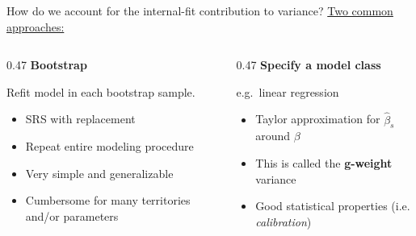 \documentclass[
  ignorenonframetext,
  aspectratio=169,
]{beamer}
\begin{document}
\begin{frame}{How do we account for the internal-fit contribution to
variance?}
\label{how-do-we-account-for-the-internal-fit-contribution-to-variance}
\underline{Two common approaches:} \vspace{0.7em}

\begin{columns}[T,onlytextwidth]

\begin{column}{0.47\textwidth}
\textbf{Bootstrap}

\vspace{0.4em}

Refit model in each bootstrap sample.

\vspace{0.8em}

\begin{itemize}
  \item SRS with replacement \vspace{0.5em}
  \item Repeat entire modeling procedure \vspace{0.5em}
  \item Very simple and generalizable \vspace{0.5em}
  \item Cumbersome for many territories and/or parameters
\end{itemize}
\end{column}

\begin{column}{0.47\textwidth}
\textbf{Specify a model class}

\vspace{0.4em}

e.g.\ linear regression

\vspace{0.8em}

\begin{itemize}
  \item Taylor approximation for $\hat\beta_s$ around $\beta$ \vspace{0.5em}
  \item This is called the \textbf{g-weight} variance \vspace{0.5em}
  \item Good statistical properties \newline (i.e. \textit{calibration})
\end{itemize}
\end{column}

\end{columns}
\end{frame}
\end{document}
